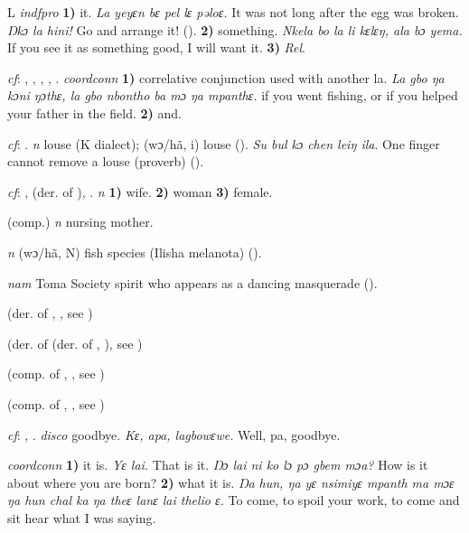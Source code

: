 \begin{letter}{L}
 \textit{indfpro} \textbf{1)} it. \textit{La yeyɛn bɛ pel lɛ pəloɛ.} It was not long after the egg was broken. \textit{Ŋkɔ la hini!} Go and arrange it! (\citealt{Pichl1967}). \textbf{2)} something. \textit{Nkela bo la li kɛlɛŋ, ala bɔ yema.} If you see it as something good, I will want it. \textbf{3)} \textit{Rel}.

 \textit{cf}: , , , , . \textit{coordconn} \textbf{1)} correlative conjunction used with another la. \textit{La gbo ŋa kɔni ŋɔthɛ, la gbo nbontho ba mɔ ŋa mpanthɛ.} if you went fishing, or if you helped your father in the field. \textbf{2)} and.

 \textit{cf}: . \textit{n} louse (K dialect); (wɔ/hã, i) louse (\citealt{Pichl1967}). \textit{Su bul kɔ chen leiŋ ila}. One finger cannot remove a louse (proverb) (\citealt{TISLL1979}).

 \textit{cf}: ,  (der. of ), . \textit{n} \textbf{1)} wife. \textbf{2)} woman \textbf{3)} female.

 (comp.) \textit{n} nursing mother.

 \textit{n} (wɔ/hã, N) fish species (Ilisha melanota) (\citealt{Pichl1967}). 

 \textit{nam} Toma Society spirit who appears as a dancing masquerade (\citealt{Pichl1967}).

 (der. of , , see )

 (der. of  (der. of , ), see ) 

 (comp. of , , see ) 

 (comp. of , , see ) 

 \textit{cf}: , . \textit{disco} goodbye. \textit{Kɛ, apa, lagbowɛwe.} Well, pa, goodbye.

 \textit{coordconn} \textbf{1)} it is. \textit{Yɛ lai.} That is it. \textit{Ŋɔ lai ni ko lɔ pɔ gbem mɔa?} How is it about where you are born? \textbf{2)} what it is. \textit{Ŋa hun, ŋa yɛ nsimiyɛ mpanth ma mɔɛ ŋa hun chal ka ŋa theɛ lanɛ lai thelio ɛ.} To come, to spoil your work, to come and sit hear what I was saying.


\end{letter}

